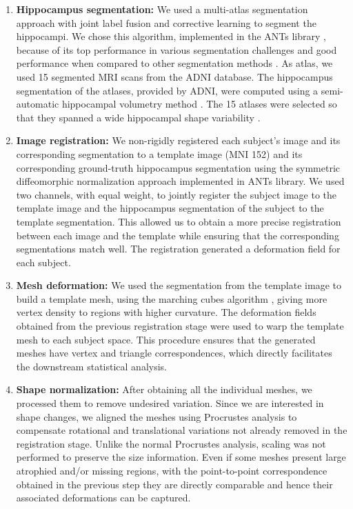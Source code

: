 \begin{enumerate}
    \item \textbf{Hippocampus segmentation:} We used a multi-atlas segmentation approach with joint label fusion and corrective learning \cite{Wang2013} to segment the hippocampi. We chose this algorithm, implemented in the ANTs library \cite{Avants2009}, because of its top performance in various segmentation challenges \cite{Wang2013} and good performance when compared to other segmentation methods \cite{Dill2015}. As atlas, we used 15 segmented MRI scans from the ADNI database. The hippocampus segmentation of the atlases, provided by ADNI, were computed using a semi-automatic hippocampal volumetry method \cite{Hsu2002}. The 15 atlases were selected so that they spanned a wide hippocampal shape variability \cite{Sanroma2014}. \\
    
    \item \textbf{Image registration:} We non-rigidly registered each subject's image and its corresponding segmentation to a template image (MNI 152) and its corresponding ground-truth hippocampus segmentation using the symmetric diffeomorphic normalization approach \cite{Avants2008a} implemented in ANTs library. We used two channels, with equal weight, to jointly register the subject image to the template image and the hippocampus segmentation of the subject to the template segmentation. This allowed us to obtain a more precise registration between each image and the template while ensuring that the corresponding segmentations match well. The registration generated a deformation field for each subject. \\
    
    \item \textbf{Mesh deformation:} We used the segmentation from the template image to build a template mesh, using the marching cubes algorithm \cite{Lorensen1987}, giving more vertex density to regions with higher curvature. The deformation fields obtained from the previous registration stage were used to warp the template mesh to each subject space. This procedure ensures that the generated meshes have vertex and triangle correspondences, which directly facilitates the downstream statistical analysis. \\

    \item \textbf{Shape normalization:} After obtaining all the individual meshes, we processed them to remove undesired variation. Since we are interested in shape changes, we aligned the meshes using Procrustes analysis \cite{Gower1975} to compensate rotational and translational variations not already removed in the registration stage. Unlike the normal Procrustes analysis, scaling was not performed to preserve the size information. Even if some meshes present large atrophied and/or missing regions, with the point-to-point correspondence obtained in the previous step they are directly comparable and hence their associated deformations can be captured.
    
\end{enumerate}

